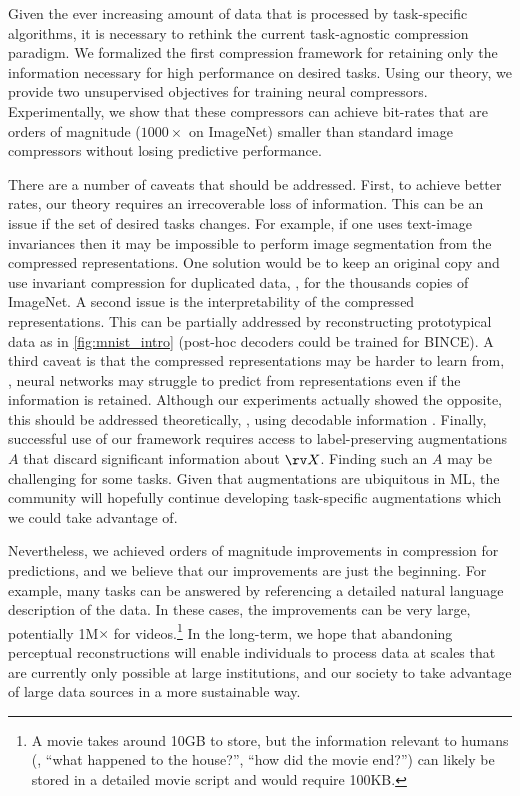 \documentclass[final]{article}
\begin{document}
Given the ever increasing amount of data that is processed by task-specific algorithms, it is necessary to rethink the current task-agnostic compression paradigm.
We formalized the first compression framework for retaining only the information necessary for high performance on desired tasks. 
Using our theory, we provide two unsupervised objectives for training neural compressors.
Experimentally, we show that these compressors can achieve  bit-rates that are orders of magnitude ($1000\times$ on ImageNet) smaller than standard image compressors without losing predictive performance.

There are a number of caveats that should be addressed. 
First, to achieve better rates, our theory requires an irrecoverable loss of information. This can be an issue if the set of desired tasks changes.
For example, if one uses text-image invariances then it may be impossible to perform image segmentation from the compressed representations.
One solution would be to keep an original copy and use invariant compression for duplicated data, \eg, for the thousands copies of ImageNet.
A second issue is the interpretability of the compressed representations.
This can be partially addressed by reconstructing prototypical data as in \cref{fig:mnist_intro} (post-hoc decoders could be trained for BINCE).
A third caveat is that the compressed representations may be harder to learn from, \eg, neural networks may struggle to predict from representations even if the information is retained.
Although our experiments actually showed the opposite, this should be addressed theoretically, \eg, using decodable information \cite{xu_theory_2020,dubois_learning_2020}.
Finally, successful use of our framework requires access to label-preserving augmentations $A$ that discard significant information about $\rv X$. 
Finding such an $A$ may be challenging for some tasks.
Given that augmentations are ubiquitous in ML, the community will hopefully continue developing task-specific augmentations which we could take advantage of.

Nevertheless, we achieved orders of magnitude improvements in compression for predictions, and we believe that our improvements are just the beginning.
For example, many tasks can be answered by referencing a detailed natural language description of the data. In these cases, the improvements can be very large, potentially 1M$\times$ for videos.\footnote{A movie takes around 10GB to store, but the information relevant to humans (\eg, ``what happened to the house?'', ``how did the movie end?'') can likely be stored in a detailed movie script and would require 100KB.}
In the long-term, we hope that abandoning perceptual reconstructions will enable individuals to process data at scales that are currently only possible at large institutions, and our society to take advantage of large data sources in a more sustainable way.  
\clearpage
\newpage
\end{document}
